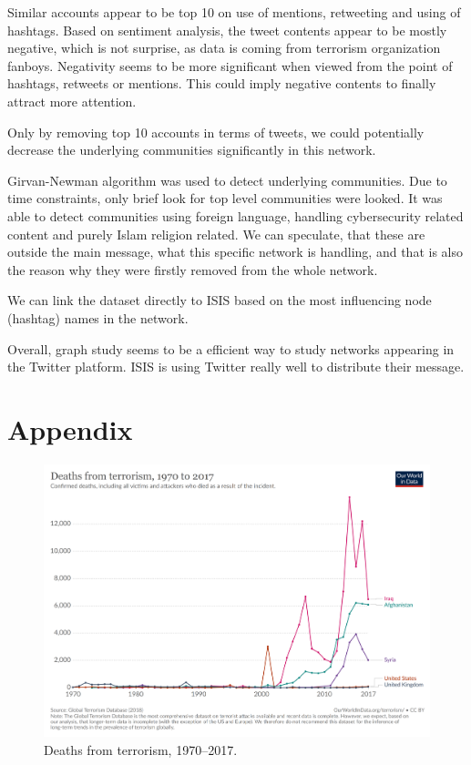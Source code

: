 \documentclass[conference]{IEEEtran}
\begin{document}
    Similar accounts appear to be top 10 on use of mentions, retweeting and using of hashtags.
    Based on sentiment analysis, the tweet contents appear to be mostly negative, which is not surprise, as data is coming from terrorism organization fanboys.
    Negativity seems to be more significant when viewed from the point of hashtags, retweets or mentions.
    This could imply negative contents to finally attract more attention.

    Only by removing top 10 accounts in terms of tweets, we could potentially decrease the underlying communities significantly in this network.

    Girvan-Newman algorithm was used to detect underlying communities.
    Due to time constraints, only brief look for top level communities were looked.
    It was able to detect communities using foreign language, handling cybersecurity related content and purely Islam religion related.
    We can speculate, that these are outside the main message, what this specific network is handling, and that is also the reason why they were firstly removed from the whole network.

    We can link the dataset directly to ISIS based on the most influencing node (hashtag) names in the network.

    Overall, graph study seems to be a efficient way to study networks appearing in the Twitter platform.
    ISIS is using Twitter really well to distribute their message.


    
    

    \newpage
    \section*{Appendix}

    \begin{figure}
        \includegraphics[scale=0.15]{figures/fatalities-from-terrorism}
        \caption{Deaths from terrorism, 1970--2017.}
        \label{fig:appendix_terrorism_deaths}
    \end{figure}\label{subsec:data-verification-after-some-pre-processing-methods}
\end{document}
